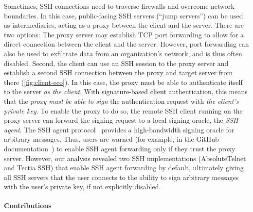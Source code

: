 Sometimes, SSH connections need to traverse firewalls and overcome network boundaries. In this case, public-facing SSH servers (``jump servers'') can be used as intermediaries, acting as a proxy between the client and the server. There are two options: The proxy server may establish TCP port forwarding to allow for a direct connection between the client and the server. However, port forwarding can also be used to exfiltrate data from an organization's network, and is thus often disabled. Second, the client can use an SSH session to the proxy server and establish a second SSH connection between the proxy and target server from there (\autoref{fig:client-eco}). In this case, the proxy must be able to authenticate itself to the server \emph{as the client}. With signature-based client authentication, this means that the \emph{proxy must be able to sign} the authentication request with \emph{the client's private key}. To enable the proxy to do so, the remote SSH client running on the proxy server can forward the signing request to a local signing oracle, the \emph{SSH agent}. The SSH agent protocol~\cite{ietf-sshm-ssh-agent-01} provides a high-bandwidth signing oracle for arbitrary messages. Thus, users are warned (for example, in the GitHub documentation~\cite{githubdocwarning}) to enable SSH agent forwarding only if they trust the proxy server. However, our analysis revealed two SSH implementations (AbsoluteTelnet and Tectia SSH) that enable SSH agent forwarding by default, ultimately giving all SSH servers that the user connects to the ability to sign arbitrary messages with the user's private key, if not explicitly disabled.

\paragraph{Contributions}

